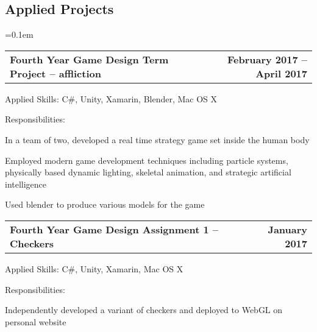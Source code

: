 \documentclass[10pt,letterpaper]{article}
\makeatletter
\newenvironment{indentsection}[1]%
{\begin{list}{}%
  {\setlength{\leftmargin}{#1}}%
  \item[]%
}
{\end{list}}
\newcommand{\headerrow}[2]
{\begin{tabular*}{\linewidth}{l@{\extracolsep{\fill}}r}
  #1 &
  #2 \\
\end{tabular*}}
\makeatother
\begin{document}
\subsection*{Applied Projects}

\begin{itemize}
  \parskip=0.1em

  \item
  \headerrow
    {\textbf{Fourth Year Game Design Term Project -- affliction}}
    {\textbf{February 2017 -- April 2017}}
  \begin{indentsection}{1em}
    \begin{description*}
      \item[Applied Skills:]
      C\#, Unity, Xamarin, Blender, Mac OS X
      \item[Responsibilities:]
      \hfill
      \begin{itemize*}
        \item In a team of two, developed a real time strategy game set inside the
        human body
        \item Employed modern game development techniques including particle
        systems, physically based dynamic lighting, skeletal animation, and
        strategic artificial intelligence
        \item Used blender to produce various models for the game
      \end{itemize*}
    \end{description*}
  \end{indentsection}

  \item
  \headerrow
    {\textbf{Fourth Year Game Design Assignment 1 -- Checkers}}
    {\textbf{January 2017}}
  \begin{indentsection}{1em}
    \begin{description*}
      \item[Applied Skills:]
      C\#, Unity, Xamarin, Mac OS X
      \item[Responsibilities:]
      \hfill
      \begin{itemize*}
        \item Independently developed a variant of checkers and deployed to WebGL
        on personal website
      \end{itemize*}
    \end{description*}
  \end{indentsection}


\end{itemize}
\end{document}
